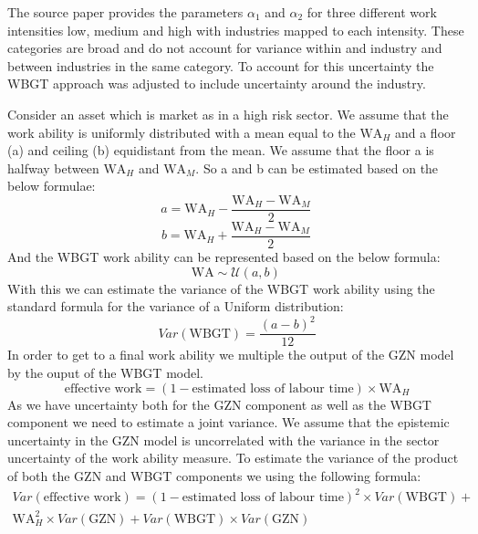 The source paper provides the parameters $\alpha_1$ and $\alpha_2$ for three different work intensities low, medium and high with industries mapped to each intensity. These categories are broad and do not account for variance within and industry and between industries in the same category. To account for this uncertainty the WBGT approach was adjusted to include uncertainty around the industry.

Consider an asset which is market as in a high risk sector. We assume that the work ability is uniformly distributed with a mean equal to the $\text{WA}_H$ and a floor (a) and ceiling (b) equidistant from the mean. We assume that the floor a is halfway between $\text{WA}_H$ and $\text{WA}_M$. So a and b can be estimated based on the below formulae:
\begin{equation}
    \label{Eq:WBGT_Floor}
     a = \text{WA}_H - \frac{\text{WA}_H - \text{WA}_M}{2}\,
\end{equation}
\begin{equation}
    \label{Eq:WBGT_Ceil}
     b = \text{WA}_H + \frac{\text{WA}_H - \text{WA}_M}{2}\,
\end{equation}
And the WBGT work ability can be represented based on the below formula:
\begin{equation}
    \label{Eq:WBGT_Uniform}
     \text{WA} \sim \mathcal{U}(a ,b)\,
\end{equation}
With this we can estimate the variance of the WBGT work ability using the standard formula for the variance of a Uniform distribution:
\begin{equation}
    \label{Eq:WBGT_Variance}
     Var\left(\text{WBGT}\right) = \frac{(a-b)^2}{ 12}
\end{equation}
In order to get to a final work ability we multiple the output of the GZN model by the ouput of the WBGT model.
\begin{equation}
    \label{Eq:Final_Mean_WA}
     \text{effective work} = \left(1- \text{estimated loss of labour time}\right) \times \text{WA}_H
\end{equation}
As we have uncertainty both for the GZN component as well as the WBGT component we need to estimate a joint variance. We assume that the epistemic uncertainty in the GZN model is uncorrelated with the variance in the sector uncertainty of the work ability measure. To estimate the variance of the product of both the GZN and WBGT components we using the following formula:
\begin{equation}
\begin{aligned}
    \label{Eq:Var_Joint}
     Var\left(\text{effective work}\right) = \left(1- \text{estimated loss of labour time}\right)^2 \times Var\left(\text{WBGT}\right) + \\
      \text{WA}_H^2 \times Var\left(\text{GZN}\right) +  Var\left(\text{WBGT}\right) \times Var\left(\text{GZN}\right)
      \end{aligned}
\end{equation}
